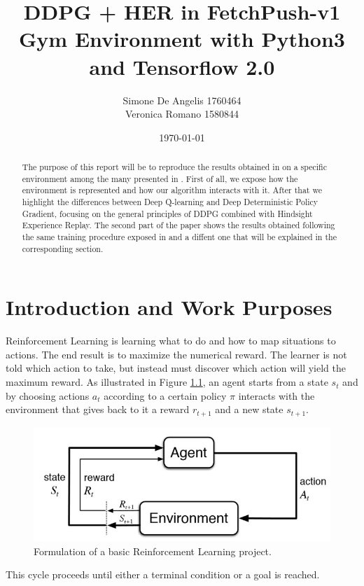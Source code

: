 \documentclass[a4paper]{report}
\title{DDPG + HER in FetchPush-v1 Gym Environment with Python3 and Tensorflow 2.0}
\author{Simone De Angelis 1760464\\ Veronica Romano 1580844}
\date{\today}
\begin{document}
\maketitle
\tableofcontents

\begin{abstract}
The purpose of this report will be to reproduce the results obtained in \cite{her} on a specific environment among the many presented in \cite{her}. First of all, we expose how the environment is represented and how our algorithm interacts with it. After that we highlight the differences between Deep Q-learning and Deep Deterministic Policy Gradient, focusing  on the general principles of DDPG combined with Hindsight Experience Replay.
The second part of the paper shows the results obtained following the same training procedure exposed in \cite{her} and a diffent one that will be explained in the corresponding section.
\end{abstract}
\chapter{Introduction and Work Purposes}
Reinforcement Learning is learning what to do and how to map situations to actions. The end result is to maximize the numerical reward. The learner is not told which action to take, but instead must discover which action will yield the maximum reward. As illustrated in Figure \ref{Fig: scheme}, an agent starts from a state $s_t$ and by choosing actions $a_t$ according to  a certain policy $\pi$ interacts with the environment that gives back to it  a reward $r_{t+1}$ and a new state $s_{t+1}$.

\begin{figure}[h!]
\centering
\includegraphics[scale=0.5]{reinforcement.jpg}
\caption{\label{Fig: scheme} Formulation of a basic Reinforcement Learning project.}
\end{figure}

This cycle proceeds until either a terminal condition or a goal is reached. 
\end{document}
